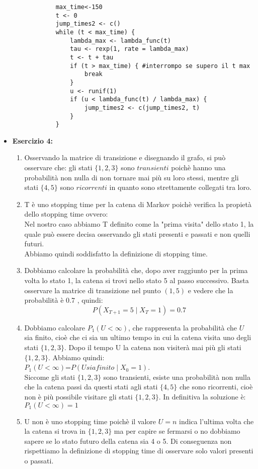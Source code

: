 \documentclass[a4paper,12pt]{article}
\begin{document}
\begin{itemize}
\begin{verbatim}
			max_time<-150
			t <- 0
			jump_times2 <- c()
			while (t < max_time) {
				lambda_max <- lambda_func(t)
				tau <- rexp(1, rate = lambda_max) 
				t <- t + tau
				if (t > max_time) { #interrompo se supero il t max
					break
				}
				u <- runif(1)
				if (u < lambda_func(t) / lambda_max) {
					jump_times2 <- c(jump_times2, t)
				}
			}
		\end{verbatim}
		\item \textbf{Esercizio 4: }
		\begin{enumerate}[label=\alph*)]
			\item Osservando la matrice di transizione e disegnando il grafo, si può osservare che:
			gli stati $\{1,2,3\}$ sono $transienti$ poichè hanno una probabilità non nulla di non tornare mai più su loro stessi, mentre gli stati $\{4,5\}$ sono $ricorrenti$ in quanto sono strettamente collegati tra loro.
			\item T è uno stopping time per la catena di Markov poichè verifica la propietà dello stopping time ovvero:\\
			Nel nostro caso abbiamo T definito come la "prima visita" dello stato 1, la quale può essere decisa osservando gli stati presenti e passati e non quelli futuri.\\
			Abbiamo quindi soddisfatto la definizione di stopping time.
			\item  Dobbiamo calcolare la probabilità che, dopo aver raggiunto per la prima volta lo stato 1, la catena si trovi nello stato 5 al passo successivo. Basta osservare la matrice di transizione nel punto $(1,5)$ e vedere che la probabilità è 0.7 , quindi:\\
			\[
			P(X_{T+1} = 5 \mid X_T = 1) = 0.7
			\]
			\item Dobbiamo calcolare \( P_1(U < \infty) \), che rappresenta la probabilità che \( U \) sia finito, cioè che ci sia un ultimo tempo in cui la catena visita uno degli stati \(\{1, 2, 3\}\). Dopo il tempo U la catena non visiterà mai più gli stati \(\{1, 2, 3\}\). Abbiamo quindi:\\
			 \( P_1(U < \infty) \)=$P(U sia finito \mid X_0=1)$.\\
			 Siccome gli stati \(\{1, 2, 3\}\) sono transienti, esiste una probabilità non nulla che la catena passi da questi stati agli stati $\{4,5\}$ che sono ricorrenti, cioè non è più possibile visitare gli stati \(\{1, 2, 3\}\). In definitiva la soluzione è:\\
			 $P_1(U < \infty) = 1
			 $
			\item U non è uno stopping time poichè il valore $U=n$ indica l'ultima volta che la catena si trova in $\{1, 2, 3\}$ ma per capire se fermarsi o no dobbiamo sapere se lo stato futuro della catena sia 4 o 5. Di conseguenza non rispettiamo la definizione di stopping time di osservare solo valori presenti o passati.

\end{enumerate}
\end{itemize}
\end{document}
